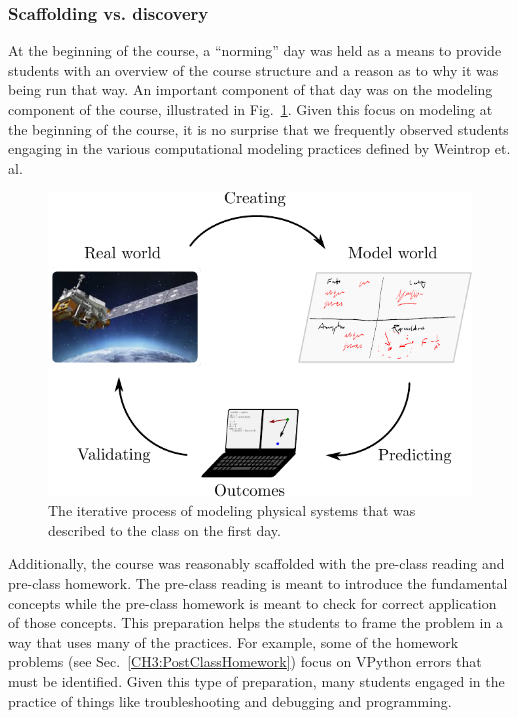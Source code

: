 \documentclass{msuphddissertation}
\begin{document}
\begin{doublespace}
\subsubsection{Scaffolding vs. discovery}

At the beginning of the course, a ``norming'' day was held as a means to provide students with an overview of the course structure and a reason as to why it was being run that way.  An important component of that day was on the modeling component of the course, illustrated in Fig.~\ref{CH6:Modeling}.  Given this focus on modeling at the beginning of the course, it is no surprise that we frequently observed students engaging in the various computational modeling practices defined by Weintrop et. al.

\begin{figure}\center
\includegraphics[scale=1]{images/CH6Modeling.pdf}
\caption{The iterative process of modeling physical systems that was described to the class on the first day.}\label{CH6:Modeling}
\end{figure}

Additionally, the course was reasonably scaffolded with the pre-class reading and pre-class homework.  The pre-class reading is meant to introduce the fundamental concepts while the pre-class homework is meant to check for correct application of those concepts.  This preparation helps the students to frame the problem in a way that uses many of the practices.  For example, some of the homework problems (see Sec.~\ref{CH3:PostClassHomework}) focus on VPython errors that must be identified.  Given this type of preparation, many students engaged in the practice of things like troubleshooting and debugging and programming.


\end{doublespace}
\end{document}
